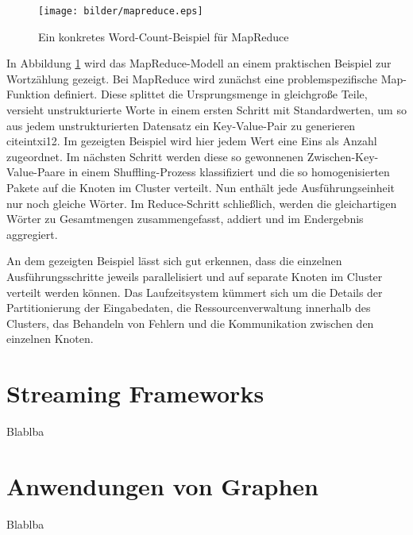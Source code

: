 \begin{figure}[htb!]
\centering
\texttt{[image: bilder/mapreduce.eps]}
\caption{Ein konkretes Word-Count-Beispiel für MapReduce}
\label{fig:wordcount}
\end{figure}   
 


In Abbildung \ref{fig:wordcount} wird das MapReduce-Modell an einem praktischen Beispiel zur Wortzählung gezeigt. Bei MapReduce wird zunächst eine problemspezifische Map-Funktion definiert. Diese splittet die Ursprungsmenge in gleichgroße Teile, versieht unstrukturierte Worte in einem ersten Schritt mit Standardwerten, um so aus jedem unstrukturierten Datensatz ein Key-Value-Pair zu generieren citeint{xi12}. Im gezeigten Beispiel wird hier jedem Wert eine Eins als Anzahl zugeordnet. Im nächsten Schritt werden diese so gewonnenen Zwischen-Key-Value-Paare in einem Shuffling-Prozess klassifiziert und die so homogenisierten Pakete auf die Knoten im Cluster verteilt. Nun enthält jede Ausführungseinheit nur noch gleiche Wörter. Im Reduce-Schritt schließlich, werden die gleichartigen Wörter zu Gesamtmengen zusammengefasst, addiert und im Endergebnis aggregiert. 

An dem gezeigten Beispiel lässt sich gut erkennen, dass die einzelnen Ausführungsschritte jeweils parallelisiert und auf separate Knoten im Cluster verteilt werden können. Das Laufzeitsystem kümmert sich um die Details der Partitionierung der Eingabedaten, die Ressourcenverwaltung innerhalb des Clusters, das Behandeln von Fehlern und die Kommunikation zwischen den einzelnen Knoten. 
 

\section{Streaming Frameworks}
\label{section:streaming framworks}

Blablba

\section{Anwendungen von Graphen}
\label{section:anwendungen von graphen}

Blablba